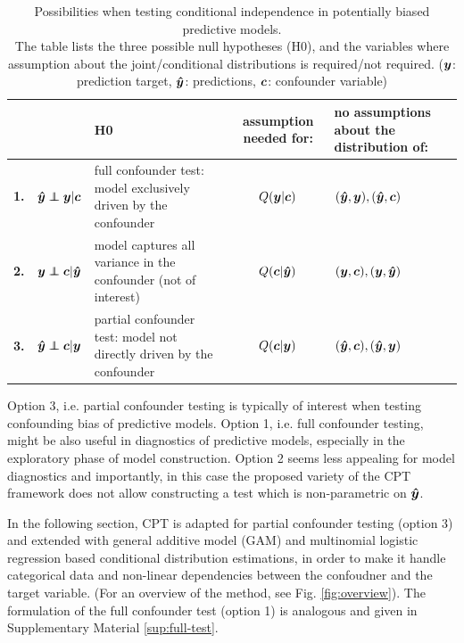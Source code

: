 \documentclass{article}
\begin{document}
\renewcommand{\arraystretch}{1.2}
\begin{table}[]
\centering
\begin{tabular}{l|rp{60mm}|c|>{\centering\arraybackslash}m{30mm}}
 &  & H0  & assumption needed for: & no assumptions about the distribution of: \\
\hline
\textbf{1.} & $\yhat \independent \y | \c$ \quad  & full confounder test: model exclusively driven by the confounder & $Q(\boldsymbol{y}|\boldsymbol{c})$ & $(\boldsymbol{\hat{y}},\boldsymbol{y}), (\boldsymbol{\hat{y}}, \boldsymbol{c})$ \\
\textbf{2.} & $\y \independent \c | \yhat$ \quad & model captures all variance in the confounder (not of interest) & $Q(\boldsymbol{c}|\boldsymbol{\hat{y}})$ & $(\boldsymbol{y}, \boldsymbol{c}), (\boldsymbol{y}, \boldsymbol{\hat{y}})$ \\
\textbf{3.} & $\yhat \independent \c | \y$  \quad &  partial confounder  test: model not directly driven by the confounder & $Q(\boldsymbol{c}|\boldsymbol{y})$ & $(\boldsymbol{\hat{y}}, \boldsymbol{c}), (\boldsymbol{\hat{y}}, \boldsymbol{y})$ \\
\end{tabular}
\caption{\label{tab:conditional-independence-cases} Possibilities when testing conditional independence in potentially biased predictive models. \\The table lists the three possible null hypotheses (H0), and the variables where assumption about the joint/conditional distributions is required/not required.   ($\boldsymbol{y}$: prediction target, $\boldsymbol{\hat{y}}$: predictions, $\boldsymbol{c}$: confounder variable) }
\end{table}

Option 3, i.e. partial confounder testing is typically of interest when testing confounding bias of predictive models. Option 1, i.e. full confounder testing, might be also useful in diagnostics of predictive models, especially in the exploratory phase of model construction. Option 2 seems less appealing for model diagnostics and importantly, in this case the proposed variety of the CPT framework does not allow constructing a test which is non-parametric on $\boldsymbol{\hat{y}}$.

In the following section, CPT is adapted for partial confounder testing (option 3) and extended with general additive model\cite{hastie1987generalized} (GAM) and multinomial logistic regression\citep{bennett1966multiple, jones1975proability} based conditional distribution estimations, in order to make it handle categorical data and non-linear dependencies between the confoudner and the target variable. (For an overview of the method, see Fig. \ref{fig:overview}). The formulation of the full confounder test (option 1) is analogous and given in Supplementary Material \ref{sup:full-test}.
\end{document}

